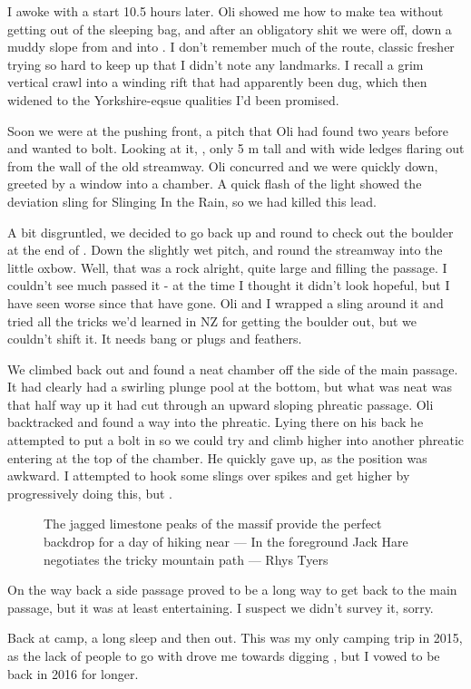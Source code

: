 I awoke with a start 10.5 hours later. Oli showed me how to make tea without getting out of the sleeping bag, and after an obligatory shit we were off, down a muddy slope from  and into . I don’t remember much of the route, classic fresher trying so hard to keep up that I didn’t note any landmarks. I recall a grim vertical crawl into a winding rift that had apparently been dug, which then widened to the Yorkshire-eqsue qualities I’d been promised.

Soon we were at the pushing front, a pitch that Oli had found two years before and wanted to bolt. Looking at it, , only 5 m tall and with wide ledges flaring out from the wall of the old streamway. Oli concurred and we were quickly down, greeted by a window into a chamber. A quick flash of the light showed the deviation sling for Slinging In the Rain, so we had killed this lead. 

A bit disgruntled, we decided to go back up and round to check out the boulder at the end of . Down the slightly wet pitch, and round the streamway into the little oxbow. Well, that was a rock alright, quite large and filling the passage. I couldn’t see much passed it - at the time I thought it didn’t look hopeful, but I have seen worse since that have gone. Oli and I wrapped a sling around it and tried all the tricks we’d learned in NZ for getting the boulder out, but we couldn’t shift it. It needs bang or plugs and feathers.

We climbed back out and found a neat chamber off the side of the main passage. It had clearly had a swirling plunge pool at the bottom, but what was neat was that half way up it had cut through an upward sloping phreatic passage. Oli backtracked and found a way into the phreatic. Lying there on his back he attempted to put a bolt in so we could try and climb higher into another phreatic entering at the top of the chamber. He quickly gave up, as the position was awkward. I attempted to hook some slings over spikes and get higher by progressively doing this, but .

\begin{figure}[t!]
\checkoddpage \ifoddpage \forcerectofloat \else \forceversofloat \fi
\centering
{}
\caption{The jagged limestone peaks of the  massif provide the perfect backdrop for a day of hiking near  --- In the foreground Jack Hare negotiates the tricky mountain path --- Rhys Tyers}
\label{kukjack}
\end{figure}

On the way back a side passage proved to be a long way to get back to the main passage, but it was at least entertaining. I suspect we didn’t survey it, sorry.

Back at camp, a long sleep and then out. This was my only camping trip in 2015, as the lack of people to go with drove me towards digging , but I vowed to be back in 2016 for longer.

